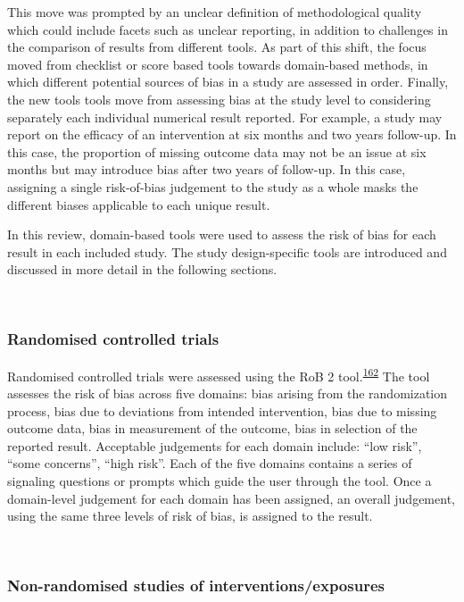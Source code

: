 \documentclass[a4paper, twoside]{templates/ociamthesis}
\begin{document}
This move was prompted by an unclear definition of methodological quality which could include facets such as unclear reporting, in addition to challenges in the comparison of results from different tools. As part of this shift, the focus moved from checklist or score based tools towards domain-based methods, in which different potential sources of bias in a study are assessed in order. Finally, the new tools tools move from assessing bias at the study level to considering separately each individual numerical result reported. For example, a study may report on the efficacy of an intervention at six months and two years follow-up. In this case, the proportion of missing outcome data may not be an issue at six months but may introduce bias after two years of follow-up. In this case, assigning a single risk-of-bias judgement to the study as a whole masks the different biases applicable to each unique result.

In this review, domain-based tools were used to assess the risk of bias for each result in each included study. The study design-specific tools are introduced and discussed in more detail in the following sections.

~

\hypertarget{randomised-controlled-trials-1}{%
\subsubsection{Randomised controlled trials}\label{randomised-controlled-trials-1}}

Randomised controlled trials were assessed using the RoB 2 tool.\textsuperscript{\protect\hyperlink{ref-sterne2019}{162}} The tool assesses the risk of bias across five domains: bias arising from the randomization process, bias due to deviations from intended intervention, bias due to missing outcome data, bias in measurement of the outcome, bias in selection of the reported result. Acceptable judgements for each domain include: ``low risk'', ``some concerns'', ``high risk''. Each of the five domains contains a series of signaling questions or prompts which guide the user through the tool. Once a domain-level judgement for each domain has been assigned, an overall judgement, using the same three levels of risk of bias, is assigned to the result.

~

\hypertarget{rob-tools-nrse}{%
\subsubsection{Non-randomised studies of interventions/exposures}\label{rob-tools-nrse}}
\end{document}
